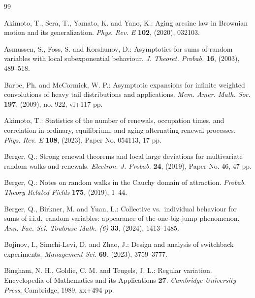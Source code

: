 \documentclass[EJP,preprint]{ejpecp}
\theoremstyle{ejpecpbodyit}
\begin{document}











\appendix



\begin{thebibliography}{99}

 Akimoto, T., Sera, T., Yamato, K. and Yano, K.: Aging arcsine law in
  Brownian motion and its generalization. \emph{Phys. Rev. E} \textbf{102}, (2020), 032103.

 Asmussen, S., Foss, S. and Korshunov, D.: Asymptotics for sums of random
  variables with local subexponential behaviour. \emph{J. Theoret. Probab.} \textbf{16},
  (2003), 489--518. 

 Barbe, Ph. and McCormick, W. P.: Asymptotic expansions for
  infinite weighted convolutions of heavy tail distributions and applications. \emph{Mem.
  Amer. Math. Soc.} \textbf{197}, (2009), no. 922, vi+117 pp. 

 Akimoto, T.: Statistics of the number of renewals,
  occupation times, and correlation in ordinary, equilibrium, and aging
  alternating renewal processes. \emph{Phys. Rev. E} \textbf{108}, (2023),
  Paper No. 054113, 17 pp. 

 Berger, Q.: Strong renewal theorems and local large
  deviations for multivariate random walks and renewals. \emph{Electron. J.
  Probab.} \textbf{24}, (2019), Paper No. 46, 47 pp. 

 Berger, Q.: Notes on random walks in the Cauchy domain
  of attraction. \emph{Probab. Theory Related Fields} \textbf{175}, (2019),
  1--44. 

 Berger, Q., Birkner, M. and Yuan, L.: Collective vs.\
  individual behaviour for sums of i.i.d.\ random variables: appearance of the
  one-big-jump phenomenon. \emph{Ann. Fac. Sci. Toulouse Math. (6)}
  \textbf{33}, (2024), 1413--1485. \MR{4899969}

 Bojinov, I., Simchi-Levi, D. and Zhao, J.: Design and analysis of
  switchback experiments. \emph{Management Sci.} \textbf{69}, (2023), 3759--3777.
  \ARXIV{2009.00148}

 Bingham, N. H., Goldie, C. M. and Teugels, J. L.: Regular
  variation. Encyclopedia of Mathematics and its Applications \textbf{27}.
  \emph{Cambridge University Press}, Cambridge, 1989. xx+494 pp.
  \MR{1015093}


\end{thebibliography}
\end{document}
